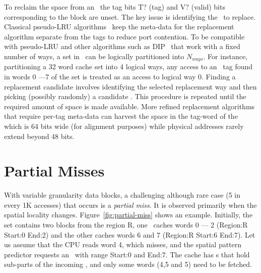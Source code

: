 To reclaim the space from an \AB\, the tag bits T? (tag) and V? (valid) bits corresponding to the block are unset. The key issue is identifying the \AB\ to replace. Classical pseudo-LRU algorithms~\cite{Kedzierski-ipdps-2010,manual:OpenSparcT1} keep the meta-data for the replacement algorithm separate from the tags to reduce port contention. To be compatible with pseudo-LRU and other algorithms such as DIP~\cite{qureshi-isca-2007} that work with a fixed number of ways, a set in \AC\ can be logically partitioned into $N_{ways}$. For instance, partitioning a 32 word cache set into 4 logical ways, any access to an \AB\ tag found in words 0 ---7 of the set is treated as an access to logical way 0. Finding a replacement candidate involves identifying the selected replacement way and then picking (possibly randomly) a candidate \AB{}. This procedure is repeated until the required amount of space is made available. More refined replacement algorithms that require per-tag meta-data can harvest the space in the tag-word of the \AB\, which is 64 bits wide (for alignment purposes) while physical addresses rarely extend beyond 48 bits.

\section{Partial Misses} 
\label{sec:partialmiss} 

With variable granularity data blocks, a challenging although rare case (5 in every 1K accesses) that occurs is a \textit{partial miss}. It is observed primarily when the spatial locality changes.  Figure~\ref{fig:partial-miss} shows an example. Initially, the set contains two blocks from the region R, one \AB\ caches words 0 --- 2 (Region:R Start:0 End:2) and the other caches words 6 and 7 (Region:R Start:6 End:7). Let us assume that the CPU reads word 4, which misses, and the spatial pattern predictor requests an \AB\ with range Start:0 and End:7. The cache has \AB{}s that hold sub-parts of the incoming \AB{}, and only some words (4,5 and 5) need to be fetched.

